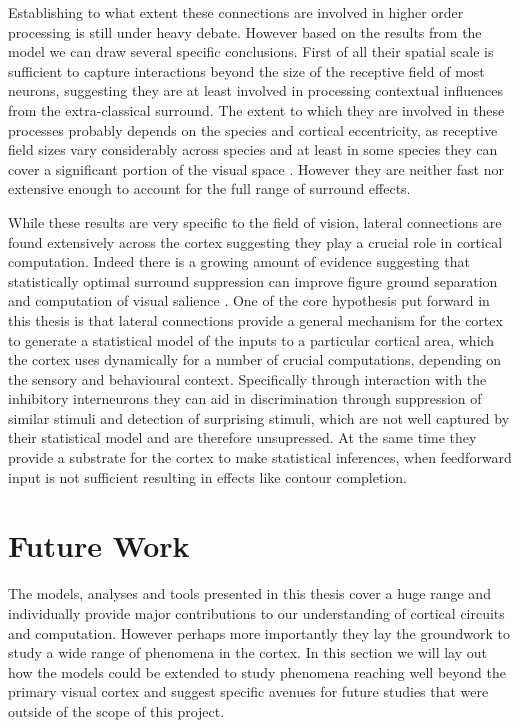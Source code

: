 Establishing to what extent these connections are involved in higher
order processing is still under heavy debate. However based on the
results from the model we can draw several specific conclusions. First
of all their spatial scale is sufficient to capture interactions
beyond the size of the receptive field of most neurons, suggesting
they are at least involved in processing contextual influences from
the extra-classical surround. The extent to which they are involved in
these processes probably depends on the species and cortical
eccentricity, as receptive field sizes vary considerably across
species and at least in some species they can cover a significant
portion of the visual space \citep{Bosking1997}. However they are
neither fast nor extensive enough to account for the full range of
surround effects.

While these results are very specific to the field of vision, lateral
connections are found extensively across the cortex suggesting they
play a crucial role in cortical computation. Indeed there is a growing
amount of evidence suggesting that statistically optimal surround
suppression can improve figure ground separation and computation of
visual salience \citep{Coen2013, Coen2015}. One of the core hypothesis
put forward in this thesis is that lateral connections provide a
general mechanism for the cortex to generate a statistical model of
the inputs to a particular cortical area, which the cortex uses
dynamically for a number of crucial computations, depending on the
sensory and behavioural context. Specifically through interaction with
the inhibitory interneurons they can aid in discrimination through
suppression of similar stimuli and detection of surprising stimuli,
which are not well captured by their statistical model and are
therefore unsupressed. At the same time they provide a substrate for
the cortex to make statistical inferences, when feedforward input is
not sufficient resulting in effects like contour completion.

\section{Future Work}

The models, analyses and tools presented in this thesis cover a huge
range and individually provide major contributions to our
understanding of cortical circuits and computation. However perhaps
more importantly they lay the groundwork to study a wide range of
phenomena in the cortex. In this section we will lay out how the
models could be extended to study phenomena reaching well beyond the
primary visual cortex and suggest specific avenues for future studies
that were outside of the scope of this project.

